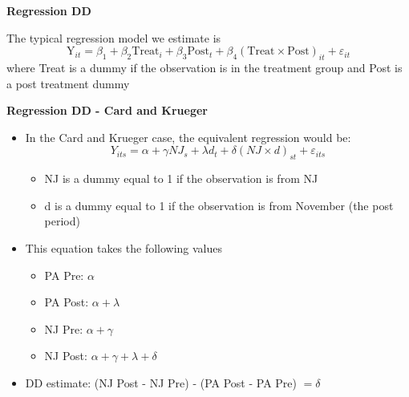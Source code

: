 \documentclass[notes=show]{beamer}
\begin{document}
\begin{frame}[plain]
\begin{center}
\textbf{Regression DD}
\end{center}

 The typical regression model we estimate is$$\text{Y}_{it} = \beta_1 + \beta_2 \text{Treat}_i + \beta_3 \text{Post}_t + \beta_4(\text{Treat}\times\text{Post})_{it} + \varepsilon_{it}$$
	where Treat is a dummy if the observation is in the treatment group and Post is a post treatment dummy

\end{frame}

\begin{frame}[plain]
	\begin{center}
	\textbf{Regression DD - Card and Krueger}
	\end{center}
	
	\begin{itemize}
	\item In the Card and Krueger case, the equivalent regression would be:$$Y_{its} = \alpha + \gamma NJ_s + \lambda d_t + \delta (NJ \times d)_{st} + \varepsilon_{its}$$
		\begin{itemize}
		\item NJ is a dummy equal to 1 if the observation is from NJ
		\item d is a dummy equal to 1 if the observation is from November (the post period)
		\end{itemize}
	\item This equation takes the following values
		\begin{itemize}
		\item PA Pre: $\alpha$
		\item PA Post: $\alpha + \lambda$
		\item NJ Pre: $\alpha + \gamma$
		\item NJ Post: $\alpha + \gamma + \lambda + \delta$
		\end{itemize}
	\item DD estimate: (NJ Post - NJ Pre) - (PA Post - PA Pre) $= \delta$
	\end{itemize}
\end{frame}
\end{document}
